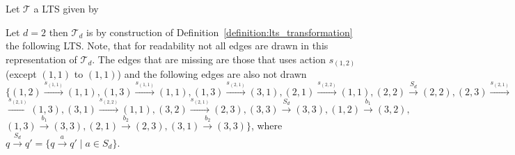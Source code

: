 \begin{example}
    Let $\mathcal{T}$ a LTS given by
    \begin{center}
    \end{center}
    Let $d = 2$ then $\mathcal{T}_d$ is by construction of Definition~\ref{definition:lts_transformation} the
    following LTS. Note, that for readability not all edges are drawn in this representation of $\mathcal{T}_d$.
    The edges that are missing are those that uses action $s_{(1, 2)}$ (except $(1, 1)$ to $(1,
    1)$) and the following edges are also not drawn
    $\{(1, 2) \overset{s_{(1, 1)}}{\rightarrow} (1, 1),
    (1, 3) \overset{s_{(1, 1)}}{\rightarrow} (1, 1),
    (1, 3) \overset{s_{(2, 1)}}{\rightarrow} (3, 1),
    (2, 1) \overset{s_{(2, 2)}}{\rightarrow} (1, 1),
    (2, 2) \overset{S_d}{\rightarrow} (2, 2),
    (2, 3) \overset{s_{(2, 1)}}{\rightarrow} (3, 2),
    (3, 1) $ $\overset{s_{(2, 1)}}{\rightarrow} (1, 3),
    (3, 1) \overset{s_{(2, 2)}}{\rightarrow} (1, 1),
    (3, 2) \overset{s_{(2, 1)}}{\rightarrow} (2, 3),
    (3, 3) \overset{S_d}{\rightarrow} (3, 3),
    (1, 2) \overset{b_1}{\rightarrow} (3, 2),
    $ $(1, 3) \overset{b_1}{\rightarrow} (3, 3),
    (2, 1) \overset{b_2}{\rightarrow} (2, 3),
    (3, 1) \overset{b_2}{\rightarrow} (3, 3)
    \}$, where $q \overset{S_d}{\rightarrow} q' =
    \{q \overset{a}{\rightarrow} q' \mid a \in S_d\}$.
    \begin{center}
\end{center}
\end{example}
